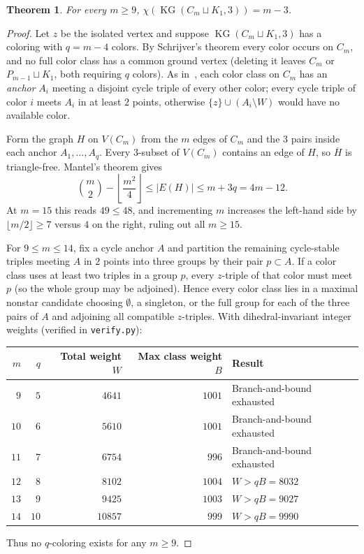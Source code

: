 \documentclass[11pt]{article}
\newtheorem{theorem}{Theorem}[section]
\DeclareMathOperator{\KG}{KG}
\begin{document}
\begin{theorem}\label{thm:iso}
For every $m \ge 9$, $\chi(\KG(C_m \sqcup K_1, 3)) = m - 3$.
\end{theorem}

\begin{proof}
Let $z$ be the isolated vertex and suppose $\KG(C_m \sqcup K_1, 3)$ has a coloring with $q = m - 4$ colors. By Schrijver's theorem every color occurs on $C_m$, and no full color class has a common ground vertex (deleting it leaves $C_m$ or $P_{m-1} \sqcup K_1$, both requiring $q$ colors). As in~\cite[Section~3]{AHKS2026}, each color class on $C_m$ has an \emph{anchor} $A_i$ meeting a disjoint cycle triple of every other color; every cycle triple of color $i$ meets $A_i$ in at least $2$ points, otherwise $\{z\} \cup (A_i \setminus W)$ would have no available color.

Form the graph $H$ on $V(C_m)$ from the $m$ edges of $C_m$ and the $3$ pairs inside each anchor $A_1, \dots, A_q$. Every $3$-subset of $V(C_m)$ contains an edge of $H$, so $\overline{H}$ is triangle-free. Mantel's theorem gives
\[
\binom{m}{2} - \left\lfloor \frac{m^2}{4} \right\rfloor \le |E(H)| \le m + 3q = 4m - 12.
\]
At $m = 15$ this reads $49 \le 48$, and incrementing $m$ increases the left-hand side by $\lfloor m/2 \rfloor \ge 7$ versus $4$ on the right, ruling out all $m \ge 15$.

For $9 \le m \le 14$, fix a cycle anchor $A$ and partition the remaining cycle-stable triples meeting $A$ in $2$ points into three groups by their pair $p \subset A$. If a color class uses at least two triples in a group $p$, every $z$-triple of that color must meet $p$ (so the whole group may be adjoined). Hence every color class lies in a maximal nonstar candidate choosing $\emptyset$, a singleton, or the full group for each of the three pairs of $A$ and adjoining all compatible $z$-triples. With dihedral-invariant integer weights (verified in \texttt{verify.py}):
\begin{center}
\begin{tabular}{rrrrl}
\toprule
$m$ & $q$ & Total weight $W$ & Max class weight $B$ & Result \\
\midrule
$9$ & $5$ & $4641$ & $1001$ & Branch-and-bound exhausted \\
$10$ & $6$ & $5610$ & $1001$ & Branch-and-bound exhausted \\
$11$ & $7$ & $6754$ & $996$ & Branch-and-bound exhausted \\
$12$ & $8$ & $8102$ & $1004$ & $W > qB = 8032$ \\
$13$ & $9$ & $9425$ & $1003$ & $W > qB = 9027$ \\
$14$ & $10$ & $10857$ & $999$ & $W > qB = 9990$ \\
\bottomrule
\end{tabular}
\end{center}
Thus no $q$-coloring exists for any $m \ge 9$.
\end{proof}
\end{document}
